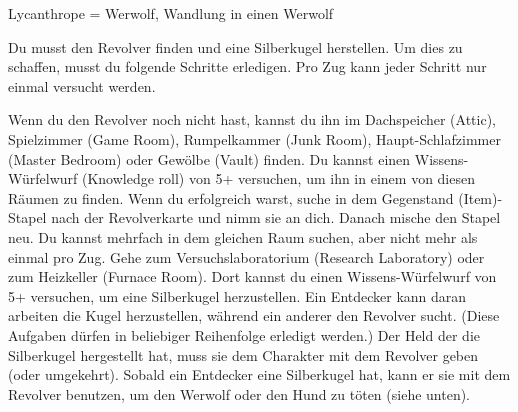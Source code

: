 
Lycanthrope = Werwolf, Wandlung in einen Werwolf





Du musst den Revolver finden und eine Silberkugel herstellen. Um dies zu schaffen, musst du folgende Schritte erledigen. Pro Zug kann jeder Schritt nur einmal versucht werden.
  \begin{itemize}
        \bitem Wenn du den Revolver noch nicht hast, kannst du ihn im Dachspeicher (Attic), Spielzimmer (Game Room), Rumpelkammer (Junk Room), Haupt-Schlafzimmer (Master Bedroom) oder Gewölbe (Vault) finden. Du kannst einen Wissens-Würfelwurf (Knowledge roll) von 5+ versuchen, um ihn in einem von diesen Räumen zu finden. Wenn du erfolgreich warst, suche in dem Gegenstand (Item)-Stapel nach der Revolverkarte und nimm sie an dich. Danach mische den Stapel neu. Du kannst mehrfach in dem gleichen Raum suchen, aber nicht mehr als einmal pro Zug.
        \bitem Gehe zum Versuchslaboratorium (Research Laboratory) oder zum Heizkeller (Furnace Room). Dort kannst du einen Wissens-Würfelwurf von 5+ versuchen, um eine Silberkugel herzustellen. Ein Entdecker kann daran arbeiten die Kugel herzustellen, während ein anderer den Revolver sucht. (Diese Aufgaben dürfen in beliebiger Reihenfolge erledigt werden.)
\newpage
        \bitem Der Held der die Silberkugel hergestellt hat, muss sie dem Charakter mit dem Revolver geben (oder umgekehrt).
        \bitem Sobald ein Entdecker eine Silberkugel hat, kann er sie mit dem Revolver benutzen, um den Werwolf oder den Hund zu töten (siehe unten).
    \end{itemize}

